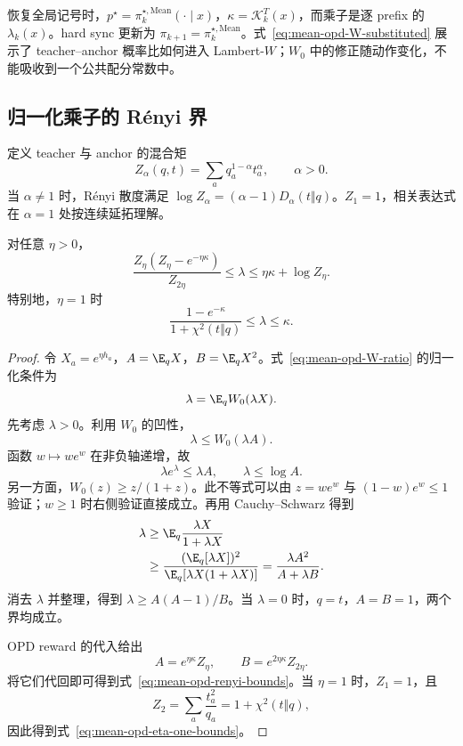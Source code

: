 恢复全局记号时，$p^\star=\pi_k^{\star,\mathrm{Mean}}(\cdot\mid x)$，$\kappa=\mathcal K_k^T(x)$，而乘子是逐 prefix 的 $\lambda_k(x)$。hard sync 更新为 $\pi_{k+1}=\pi_k^{\star,\mathrm{Mean}}$。式~\eqref{eq:mean-opd-W-substituted} 展示了 teacher--anchor 概率比如何进入 Lambert-$W$；$W_0$ 中的修正随动作变化，不能吸收到一个公共配分常数中。

\subsection{归一化乘子的 R\'enyi 界}

定义 teacher 与 anchor 的混合矩
\begin{equation}
 Z_\alpha(q,t)=\sum_a q_a^{1-\alpha}t_a^\alpha,
 \qquad \alpha>0.
 \label{eq:mean-opd-renyi-Z}
\end{equation}
当 $\alpha\ne1$ 时，R\'enyi 散度满足 $\log Z_\alpha=(\alpha-1)D_\alpha(t\Vert q)$。$Z_1=1$，相关表达式在 $\alpha=1$ 处按连续延拓理解。

\begin{proposition}
\label{prop:mean-opd-renyi-bounds}
对任意 $\eta>0$，
\begin{equation}
 \frac{Z_\eta(Z_\eta-e^{-\eta\kappa})}{Z_{2\eta}}
 \le\lambda\le\eta\kappa+\log Z_\eta.
 \label{eq:mean-opd-renyi-bounds}
\end{equation}
特别地，$\eta=1$ 时
\begin{equation}
 \frac{1-e^{-\kappa}}{1+\chi^2(t\Vert q)}
 \le\lambda\le\kappa.
 \label{eq:mean-opd-eta-one-bounds}
\end{equation}
\end{proposition}

\begin{proof}
令 $X_a=e^{\eta h_a}$，$A=\E_qX$，$B=\E_qX^2$。式~\eqref{eq:mean-opd-W-ratio} 的归一化条件为
\[
 \lambda=\E_qW_0(\lambda X).
\]
先考虑 $\lambda>0$。利用 $W_0$ 的凹性，
\[
 \lambda\le W_0(\lambda A).
\]
函数 $w\mapsto we^w$ 在非负轴递增，故
\[
 \lambda e^\lambda\le\lambda A,
 \qquad \lambda\le\log A.
\]
另一方面，$W_0(z)\ge z/(1+z)$。此不等式可以由 $z=we^w$ 与 $(1-w)e^w\le1$ 验证；$w\ge1$ 时右侧验证直接成立。再用 Cauchy--Schwarz 得到
\begin{align*}
 \lambda
 &\ge\E_q\frac{\lambda X}{1+\lambda X}\\
 &\ge\frac{(\E_q[\lambda X])^2}
            {\E_q[\lambda X(1+\lambda X)]}
 =\frac{\lambda A^2}{A+\lambda B}.
\end{align*}
消去 $\lambda$ 并整理，得到 $\lambda\ge A(A-1)/B$。当 $\lambda=0$ 时，$q=t$，$A=B=1$，两个界均成立。

OPD reward 的代入给出
\[
 A=e^{\eta\kappa}Z_\eta,
 \qquad B=e^{2\eta\kappa}Z_{2\eta}.
\]
将它们代回即可得到式~\eqref{eq:mean-opd-renyi-bounds}。当 $\eta=1$ 时，$Z_1=1$，且
\[
 Z_2=\sum_a\frac{t_a^2}{q_a}=1+\chi^2(t\Vert q),
\]
因此得到式~\eqref{eq:mean-opd-eta-one-bounds}。
\end{proof}

